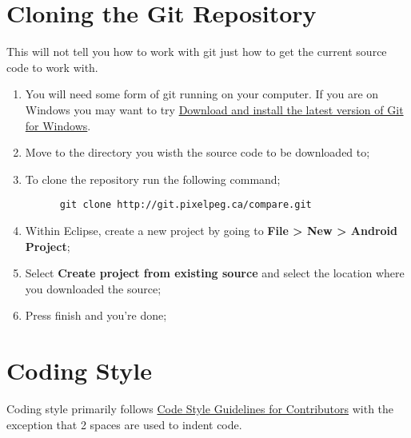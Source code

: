 \documentclass{article}
\begin{document}
\section{Cloning the Git Repository}
This will not tell you how to work with git just how to get the current source code to work with.
\begin{enumerate}
  \item
    You will need some form of git running on your computer. If you are on Windows you may want to try \href{http://help.github.com/win-set-up-git/}{Download and install the latest version of Git for Windows}.
  \item
    Move to the directory you wisth the source code to be downloaded to;
  \item
    To clone the repository run the following command;
    \begin{lstlisting}
      git clone http://git.pixelpeg.ca/compare.git
    \end{lstlisting}
  \item
    Within Eclipse, create a new project by going to \textbf{File > New > Android Project};
  \item
    Select \textbf{Create project from existing source} and select the location where you downloaded the source;
  \item
    Press finish and you're done;
\end{enumerate}

\section{Coding Style}
Coding style primarily follows \href{http://source.android.com/source/code-style.html}{Code Style Guidelines for Contributors} with the exception that 2 spaces are used to indent code.
\end{document}
